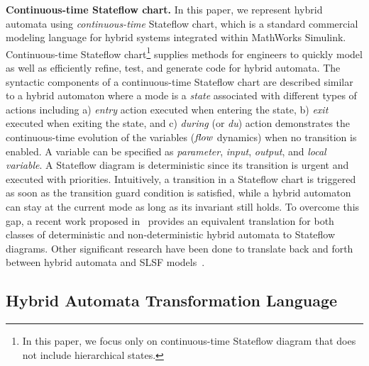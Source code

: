 \vspace{0.5em}
\noindent
{\bf Continuous-time Stateflow chart.}
%
In this paper, we represent hybrid automata using \emph{continuous-time} Stateflow chart, which is a standard commercial modeling language for hybrid systems integrated within MathWorks Simulink.
%
Continuous-time Stateflow chart\footnote{In this paper, we focus only on continuous-time Stateflow diagram that does not include hierarchical states.} supplies methods for engineers to quickly model as well as efficiently refine, test, and generate code for hybrid automata.
%
The syntactic components of a continuous-time Stateflow chart are described similar to a hybrid automaton where a mode is a \emph{state} associated with different types of actions including a) \emph{entry} action executed when entering the state, b) \emph{exit} executed when exiting the state, and c) \emph{during} (or \emph{du}) action demonstrates the continuous-time evolution of the variables (\ie ${\mathit{flow}}$ dynamics) when no transition is enabled. A variable can be specified as \emph{parameter}, \emph{input}, \emph{output}, and \emph{local variable}. A Stateflow diagram is deterministic since its transition is urgent and executed with priorities.
%
Intuitively, a transition in a Stateflow chart is triggered as soon as the transition guard condition is satisfied, while a hybrid automaton can stay at the current mode as long as its invariant still holds.  To overcome this gap, a recent work proposed in~\cite{bak2017hybrid} provides an equivalent translation for both classes of deterministic and non-deterministic hybrid automata to Stateflow diagrams. Other significant research have been done to translate back and forth between hybrid automata and SLSF models~\cite{alur2008symbolic,manamcheri2011step,minopoli2016sl2sx}.

\subsection{Hybrid Automata Transformation Language}

